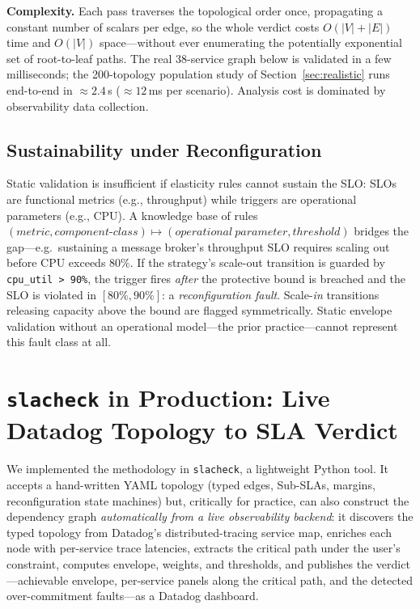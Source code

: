 \documentclass[conference]{IEEEtran}
\begin{document}
\textbf{Complexity.} Each pass traverses the topological order once, propagating a constant number of scalars per edge, so the whole verdict costs $O(|V|+|E|)$ time and $O(|V|)$ space---without ever enumerating the potentially exponential set of root-to-leaf paths. The real 38-service graph below is validated in a few milliseconds; the 200-topology population study of Section~\ref{sec:realistic} runs end-to-end in ${\approx}2.4$\,s ($\approx 12$\,ms per scenario). Analysis cost is dominated by observability data collection.

\subsection{Sustainability under Reconfiguration}\label{sec:translation}
Static validation is insufficient if elasticity rules cannot sustain the SLO: SLOs are functional metrics (e.g., throughput) while triggers are operational parameters (e.g., CPU). A knowledge base of rules $(\mathit{metric}, \mathit{component\text{-}class}) \mapsto (\mathit{operational\ parameter}, \mathit{threshold})$ bridges the gap---e.g.\ sustaining a message broker's throughput SLO requires scaling out before CPU exceeds $80\%$. If the strategy's scale-out transition is guarded by \texttt{cpu\_util > 90\%}, the trigger fires \emph{after} the protective bound is breached and the SLO is violated in $[80\%, 90\%]$: a \emph{reconfiguration fault}. Scale-\emph{in} transitions releasing capacity above the bound are flagged symmetrically. Static envelope validation without an operational model---the prior practice---cannot represent this fault class at all.

\section{\texttt{slacheck} in Production: Live Datadog Topology to SLA Verdict}\label{sec:tool}

We implemented the methodology in \texttt{slacheck}, a lightweight Python tool. It accepts a hand-written YAML topology (typed edges, Sub-SLAs, margins, reconfiguration state machines) but, critically for practice, can also construct the dependency graph \emph{automatically from a live observability backend}: it discovers the typed topology from Datadog's distributed-tracing service map, enriches each node with per-service trace latencies, extracts the critical path under the user's constraint, computes envelope, weights, and thresholds, and publishes the verdict---achievable envelope, per-service panels along the critical path, and the detected over-commitment faults---as a Datadog dashboard.
\end{document}
